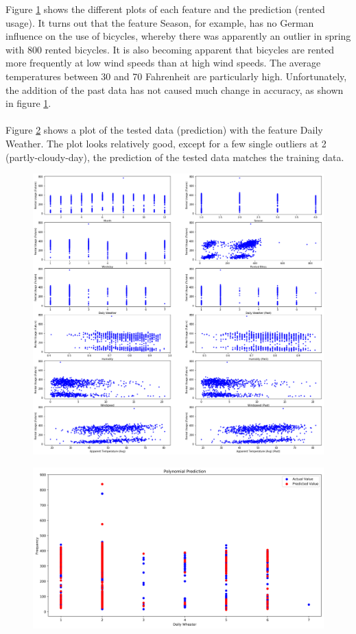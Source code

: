 Figure \ref{fig:figure9_polynomial_features} shows the different plots of each feature and the prediction (rented usage). It turns out
that the feature Season, for example, has no German influence on the use of bicycles, whereby
there was apparently an outlier in spring with 800 rented bicycles. It is also becoming apparent
that bicycles are rented more frequently at low wind speeds than at high wind speeds. The average
temperatures between 30 and 70 Fahrenheit are particularly high. Unfortunately, the addition of
the past data has not caused much change in accuracy, as shown in figure \ref{fig:figure9_polynomial_features}.\\\\
Figure \ref{fig:figure10_polynomial_prediction} shows a plot of the tested data (prediction) with the feature \glqq Daily Weather\grqq . The plot looks relatively good, except for a few single outliers at 2 (partly-cloudy-day), the prediction of the
tested data matches the training data.
\begin{figure}[H]
\hspace{-2.8cm}
\includegraphics[width=1.4\textwidth]{img/figure9_polynomial_features}\label{fig:figure9_polynomial_features}
\label{fig:figure9_polynomial_features}
\end{figure}
\begin{figure}[H]
\hspace{-2.4cm}
\includegraphics[width=1.3\textwidth]{img/figure10_polynomial_prediction}\label{fig:figure10_polynomial_prediction}
\label{fig:figure10_polynomial_prediction}
\end{figure}